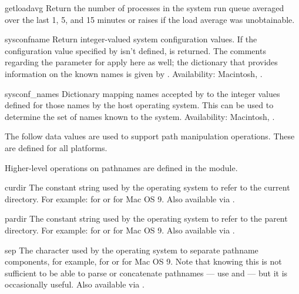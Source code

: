 \begin{funcdesc}{getloadavg}{}
Return the number of processes in the system run queue averaged over
the last 1, 5, and 15 minutes or raises  if the load 
average was unobtainable.

\end{funcdesc}

\begin{funcdesc}{sysconf}{name}
Return integer-valued system configuration values.
If the configuration value specified by  isn't defined,
 is returned.  The comments regarding the 
parameter for  apply here as well; the dictionary
that provides information on the known names is given by
.
Availability: Macintosh, \UNIX.
\end{funcdesc}

\begin{datadesc}{sysconf_names}
Dictionary mapping names accepted by  to the
integer values defined for those names by the host operating system.
This can be used to determine the set of names known to the system.
Availability: Macintosh, \UNIX.
\end{datadesc}


The follow data values are used to support path manipulation
operations.  These are defined for all platforms.

Higher-level operations on pathnames are defined in the
 module.


\begin{datadesc}{curdir}
The constant string used by the operating system to refer to the current
directory.
For example:  for \POSIX{} or  for Mac OS 9.
Also available via .
\end{datadesc}

\begin{datadesc}{pardir}
The constant string used by the operating system to refer to the parent
directory.
For example:  for \POSIX{} or  for Mac OS 9.
Also available via .
\end{datadesc}

\begin{datadesc}{sep}
The character used by the operating system to separate pathname components,
for example, \character{/} for \POSIX{} or \character{:} for
Mac OS 9.  Note that knowing this is not sufficient to be able to
parse or concatenate pathnames --- use  and
 --- but it is occasionally useful.
Also available via .
\end{datadesc}

